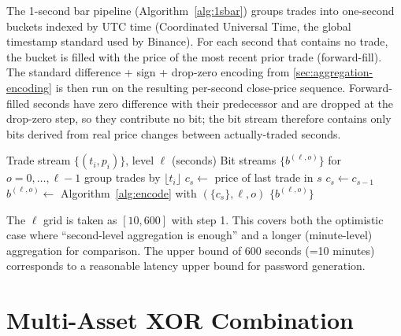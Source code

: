 \documentclass[11pt,titlepage,openany,oneside]{book}  %
\begin{document}
The 1-second bar pipeline (Algorithm~\ref{alg:1sbar}) groups trades into one-second buckets indexed by UTC time (Coordinated Universal Time, the global timestamp standard used by Binance). For each second that contains no trade, the bucket is filled with the price of the most recent prior trade (forward-fill). The standard difference + sign + drop-zero encoding from \cref{sec:aggregation-encoding} is then run on the resulting per-second close-price sequence. Forward-filled seconds have zero difference with their predecessor and are dropped at the drop-zero step, so they contribute no bit; the bit stream therefore contains only bits derived from real price changes between actually-traded seconds.

\begin{algorithm}[H]
  \caption{1-second bar pipeline (physical-time axis)}
  \label{alg:1sbar}
  \begin{algorithmic}[1]
    \Require Trade stream $\{(t_i, p_i)\}$, level $\ell$ (seconds)
    \Ensure Bit streams $\{b^{(\ell, o)}\}$ for $o = 0, \ldots, \ell - 1$
    \Statex {}
    \Statex {}
    \State group trades by $\lfloor t_i \rfloor$ 
        \State $c_s \gets$ price of last trade in $s$
      \Else
        \State $c_s \gets c_{s-1}$ 
      \EndIf
    \EndFor
    \Statex {}
      \State $b^{(\ell, o)} \gets$ Algorithm~\ref{alg:encode} with $(\{c_s\}, \ell, o)$
    \EndFor
    \State \Return $\{b^{(\ell, o)}\}$
  \end{algorithmic}
\end{algorithm}

The $\ell$ grid is taken as $[10, 600]$ with step 1. This covers both the optimistic case where ``second-level aggregation is enough'' and a longer (minute-level) aggregation for comparison. The upper bound of 600 seconds (=10 minutes) corresponds to a reasonable latency upper bound for password generation.

\section{Multi-Asset XOR Combination}
\label{sec:multi-asset-xor}
\end{document}
